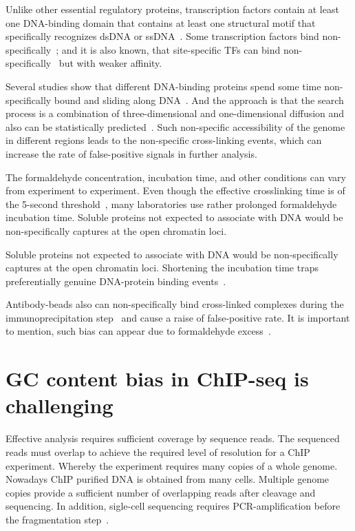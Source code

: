Unlike other essential regulatory proteins, transcription factors contain at least one DNA-binding domain that contains at least one structural motif that specifically recognizes dsDNA or ssDNA~\cite{mitchell1989transcriptional}.
Some transcription factors bind non-specifically~\cite{struhl2007interpreting};
and it is also known, that site-specific TFs can bind non-specifically~\cite{hammar2012lac,mirny2009protein} but with weaker affinity.

Several studies show that different DNA-binding proteins spend some time non-specifically bound and sliding along DNA~\cite{slutsky2004kinetics,mirny2010nucleosome,cherstvy2008protein,hu2006proteins,sheinman2009effects}.
And the approach is that the search process is a combination of three-dimensional and one-dimensional diffusion and also can be statistically predicted~\cite{sela2011dna}.
Such non-specific accessibility of the genome in different regions leads to the non-specific cross-linking events, which can increase the rate of false-positive signals in further analysis.

The formaldehyde concentration, incubation time, and other conditions can vary from experiment to experiment. 
Even though the effective crosslinking time is of the 5-second threshold~\cite{schmiedeberg2009temporal}, many laboratories use rather prolonged formaldehyde incubation time.
Soluble proteins not expected to associate with DNA would be non-specifically captures at the open chromatin loci.

Soluble proteins not expected to associate with DNA would be non-specifically captures at the open chromatin loci. Shortening the incubation time traps preferentially genuine DNA-protein binding events~\cite{baranello2016chip}.

Antibody-beads also can non-specifically bind cross-linked complexes during the immunoprecipitation step~\cite{zhu2014fast} and cause a raise of false-positive rate.
It is important to mention, such bias can appear due to formaldehyde excess~\cite{hanson2018using}.



\section{GC content bias in ChIP-seq is challenging}
Effective analysis requires sufficient coverage by sequence reads. 
The sequenced reads must overlap to achieve the required level of resolution for a ChIP experiment.
Whereby the experiment requires many copies of a whole genome.
Nowadays ChIP purified DNA is obtained from many cells.
Multiple genome copies provide a sufficient number of overlapping reads after cleavage and sequencing.
In addition, sigle-cell sequencing requires PCR-amplification before the fragmentation step~\cite{clark2016single}.

